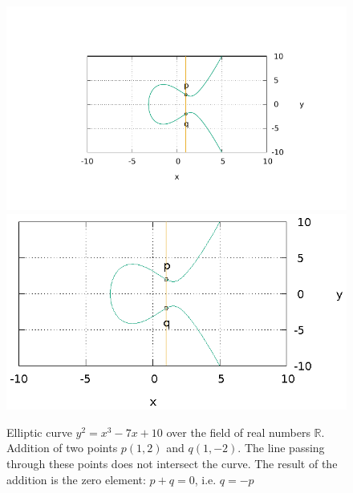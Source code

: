 \begin{figure}
\centering
\ifpdf
\includegraphics[angle=0,scale=1.5]
{./add/discretmath/picellipticsumeq.pdf}
\else
\includegraphics[angle=0,scale=1.5]
{./add/discretmath/picellipticsumeq.eps}
\fi
\caption{Elliptic curve $y^2 = x^3 -7 x + 10$ over the field of real numbers $\mathbb{R}$. Addition of two points $p(1,2)$ and $q(1,-2)$. The line passing through these points does not intersect the curve. The result of the addition is the zero element: $p + q = 0$, i.e. $q = -p$}
\label{fig:add:ellipticRsumEq}
\end{figure}